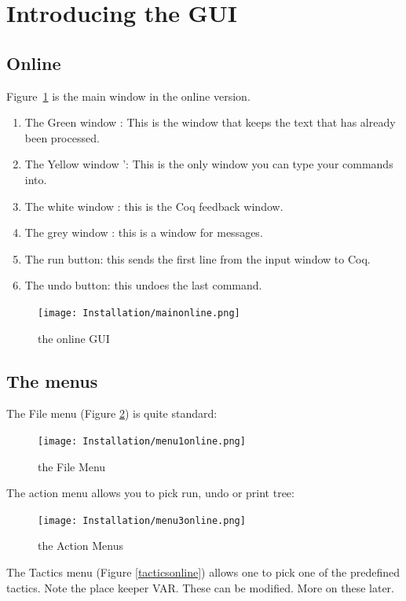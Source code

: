 \section{Introducing the GUI}
\subsection{Online}

Figure~\ref{online gui}  is the main window in the online version.

\begin{enumerate}
\item The Green window  : This is the window that keeps the text that has already been processed.
\item The Yellow window ': This is the only window you can type your commands into.
\item The white window : this is the Coq feedback window. 
\item The grey window : this is a window for messages.
\item The run button: this sends the first line from the input window to Coq.
\item The undo button: this undoes the last command.
\end{enumerate}
\begin{figure}[h!]
\texttt{[image: Installation/mainonline.png]}
\caption{the online GUI}\label{online gui}
\end{figure}

\subsection{The menus}

The File menu (Figure \ref{file}) is quite standard:

\begin{figure}[h!]
\texttt{[image: Installation/menu1online.png]}


\caption{the File  Menu}\label{file}
\end{figure}

The action menu allows you to pick run, undo or print tree:

\begin{figure}[h!]
\texttt{[image: Installation/menu3online.png]}


\caption{the Action Menus}\label{actionsonline}
\end{figure}


The Tactics menu (Figure \ref{tacticsonline}) allows one to pick one of the predefined tactics. 
Note the place keeper VAR. 
These can be modified. More on these later.

